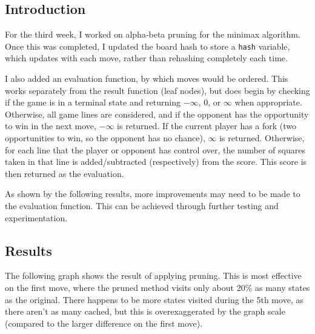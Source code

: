 \documentclass[12pt]{article}
\begin{document}
\subsection*{Introduction}
For the third week, I worked on alpha-beta pruning for the minimax algorithm. Once this was completed, I updated the board hash to store a \texttt{hash} variable, which updates with each move, rather than rehashing completely each time.

I also added an evaluation function, by which moves would be ordered. This works separately from the result function (leaf nodes), but does begin by checking if the game is in a terminal state and returning \(-\infty\), \(0\), or \(\infty\) when appropriate. Otherwise, all game lines are considered, and if the opponent has the opportunity to win in the next move, \(-\infty\) is returned. If the current player has a fork (two opportunities to win, so the opponent has no chance), \(\infty\) is returned. Otherwise, for each line that the player or opponent has control over, the number of squares taken in that line is added/subtracted (respectively) from the score. This score is then returned as the evaluation.

As shown by the following results, more improvements may need to be made to the evaluation function. This can be achieved through further testing and experimentation. 

\subsection*{Results}

The following graph shows the result of applying pruning. This is most effective on the first move, where the pruned method visits only about 20\% as many states as the original. There happens to be more states visited during the 5th move, as there aren't as many cached, but this is overexaggerated by the graph scale (compared to the larger difference on the first move).

\begin{center}
\end{center}
\end{document}
